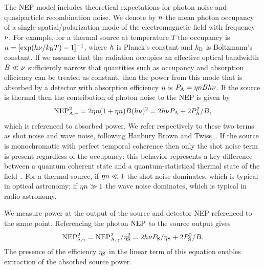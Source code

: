 The NEP model includes theoretical expectations for photon noise and quasiparticle recombination noise.
We denote by $n$ the mean photon occupancy of a single spatial/polarization mode of the electromagnetic field with frequency $\nu$.
For example, for a thermal source at temperature $T$ the occupancy is
$n = [\exp(h \nu / k_\mathrm{B} T) - 1]^{-1}$,
where $h$ is Planck's constant and $k_\mathrm{B}$ is Boltzmann's constant.
If we assume that the radiation occupies an effective optical bandwidth $B \ll \nu$ sufficiently narrow that quantities such as occupancy and absorption efficiency can be treated as constant, then the power from this mode that is absorbed by a detector with absorption efficiency $\eta$ is
$P_{\mathrm{A}} = \eta n B h \nu$.
If the source is thermal then the contribution of photon noise to the NEP is given by~\autocite{Zmuidzinas2003ApplOpt}
\begin{equation}
\label{eqn:photon_nep}
\mathrm{NEP}_{\mathrm{A}, \gamma}^2
  =
  2 \eta n (1 + \eta n) B (h \nu)^2
  =
  2 h \nu P_{\mathrm{A}} + 2 P_{\mathrm{A}}^2 / B,
\end{equation}
which is referenced to absorbed power.
We refer respectively to these two terms as shot noise and wave noise, following Hanbury Brown and Twiss~\autocite{HBTI1957RoyalSoc}.
If the source is monochromatic with perfect temporal coherence then only the shot noise term is present regardless of the occupancy: this behavior represents a key difference between a quantum coherent state and a quantum-statistical thermal state of the field~\autocite{Loudon2002,Glauber2006Nobel}.
For a thermal source, if $\eta n \ll 1$ the shot noise dominates, which is typical in optical astronomy; if $\eta n \gg 1$ the wave noise dominates, which is typical in radio astronomy.

We measure power at the output of the source and detector NEP referenced to the same point.
Referencing the photon $\mathrm{NEP}$ to the source output gives
\begin{equation}
\label{eqn:photon_nep_source}
\mathrm{NEP}_{\mathrm{S}, \gamma}^2
  =
  \mathrm{NEP}_{\mathrm{A}, \gamma}^2 / \eta_{\mathrm{S}}^2
  =
  2 h \nu P_{\mathrm{S}} / \eta_{\mathrm{S}} + 2 P_{\mathrm{S}}^2 / B.
\end{equation}
The presence of the efficiency $\eta_{\mathrm{S}}$ in the linear term of this equation enables extraction of the absorbed source power.

